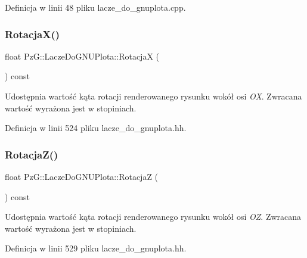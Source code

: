 Definicja w linii 48 pliku lacze\+\_\+do\+\_\+gnuplota.\+cpp.

\mbox{\label{class_pz_g_1_1_lacze_do_g_n_u_plota_addf0b844f626f3f5220de70efcbbdbb3}} 
\subsubsection{\texorpdfstring{Rotacja\+X()}{RotacjaX()}}
{\footnotesize\ttfamily float Pz\+G\+::\+Lacze\+Do\+G\+N\+U\+Plota\+::\+RotacjaX (\begin{DoxyParamCaption}{ }\end{DoxyParamCaption}) const\hspace{0.3cm}{\ttfamily [inline]}}

Udostępnia wartość kąta rotacji renderowanego rysunku wokół osi {\itshape OX}. Zwracana wartość wyrażona jest w stopiniach. 

Definicja w linii 524 pliku lacze\+\_\+do\+\_\+gnuplota.\+hh.

\mbox{\label{class_pz_g_1_1_lacze_do_g_n_u_plota_a9dac73754fab10644b287756003e9c79}} 
\subsubsection{\texorpdfstring{Rotacja\+Z()}{RotacjaZ()}}
{\footnotesize\ttfamily float Pz\+G\+::\+Lacze\+Do\+G\+N\+U\+Plota\+::\+RotacjaZ (\begin{DoxyParamCaption}{ }\end{DoxyParamCaption}) const\hspace{0.3cm}{\ttfamily [inline]}}

Udostępnia wartość kąta rotacji renderowanego rysunku wokół osi {\itshape OZ}. Zwracana wartość wyrażona jest w stopiniach. 

Definicja w linii 529 pliku lacze\+\_\+do\+\_\+gnuplota.\+hh.

\mbox{\label{class_pz_g_1_1_lacze_do_g_n_u_plota_a065f5b8402737cc62b0ad4f66d028335}} 
